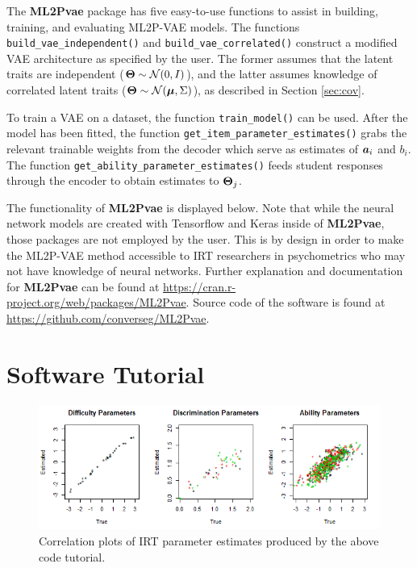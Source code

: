 The \textbf{ML2Pvae} package has five easy-to-use functions to assist in building, training, and evaluating ML2P-VAE models. The functions {\color{blue}\verb!build_vae_independent()!} and {\color{blue}\verb!build_vae_correlated()!} construct a modified VAE architecture as specified by the user. The former assumes that the latent traits are independent ($\boldsymbol{\Theta} \sim \mathcal{N}(0,I)$), and the latter assumes knowledge of correlated latent traits ($\boldsymbol{\Theta} \sim \mathcal{N}(\boldsymbol{\mu}, \Sigma)$), as described in Section \ref{sec:cov}.

To train a VAE on a dataset, the function {\color{blue}\verb!train_model()!} can be used. After the model has been fitted, the function {\color{blue}\verb!get_item_parameter_estimates()!} grabs the relevant trainable weights from the decoder which serve as estimates of $\boldsymbol{a}_i$ and $b_i$. The function {\color{blue}\verb!get_ability_parameter_estimates()!} feeds student responses through the encoder to obtain estimates to $\boldsymbol{\Theta}_j$.

The functionality of \textbf{ML2Pvae} is displayed below. Note that while the neural network models are created with Tensorflow and Keras \cite{keras_r} inside of \textbf{ML2Pvae}, those packages are not employed by the user. This is by design in order to make the ML2P-VAE method accessible to IRT researchers in psychometrics who may not have knowledge of neural networks. Further explanation and documentation for \textbf{ML2Pvae} can be found at {\color{violet}\href{https://cran.r-project.org/web/packages/ML2Pvae}{https://cran.r-project.org/web/packages/ML2Pvae}}. Source code of the software is found at {\color{violet}\href{https://github.com/converseg/ML2Pvae}{https://github.com/converseg/ML2Pvae}}.

\section{Software Tutorial}
\vspace{.5cm}


\begin{figure}[h]
  \centering
  \includegraphics[width=.95\textwidth]{img/ml2pvae_tutorial_plots.png}
  \caption{Correlation plots of IRT parameter estimates produced by the above code tutorial.}
  \label{fig:tutorial_plots}
\end{figure}


